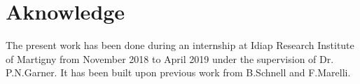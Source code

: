 \documentclass[11pt, a4paper]{article} %
\begin{document}
\section*{Aknowledge}
The present work has been done during an internship at Idiap Research Institute of Martigny from November 2018 to April 2019 under the supervision of Dr. P.N.Garner. It has been built upon previous work from B.Schnell and F.Marelli.






\end{document}
